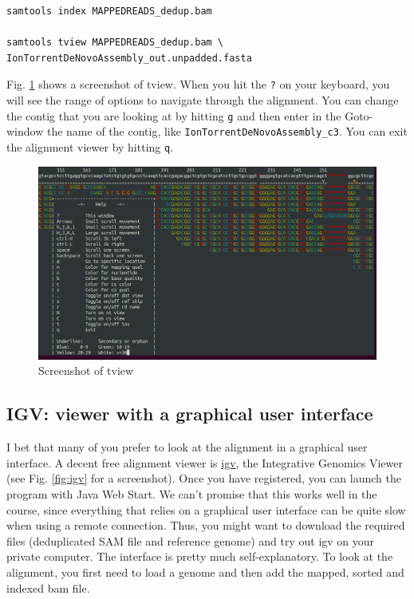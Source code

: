 \documentclass[11pt]{article}
\begin{document}
\begin{verbatim}
samtools index MAPPEDREADS_dedup.bam

samtools tview MAPPEDREADS_dedup.bam \
IonTorrentDeNovoAssembly_out.unpadded.fasta
\end{verbatim}


Fig. \ref{fig:tview} shows a screenshot of tview.  When you hit the \texttt{?} on
your keyboard, you will see the range of options to navigate through
the alignment. You can change the contig that you are looking at by
hitting \texttt{g} and then enter in the Goto-window the name of the contig,
like \texttt{IonTorrentDeNovoAssembly\_c3}.  You can exit the alignment viewer
by hitting \texttt{q}.

\begin{figure}[htb]
\centering
\includegraphics[width=14.5cm]{tview.png}
\caption{\label{fig:tview}Screenshot of tview}
\end{figure}

\clearpage
\subsection{IGV: viewer with a graphical user interface}
\label{sec-3-2}
I bet that many of you prefer to look at the alignment in a graphical
user interface. A decent free alignment viewer is \href{https://www.broadinstitute.org/igv/}{igv}, the Integrative
Genomics Viewer (see Fig. \ref{fig:igv} for a screenshot). Once you have
registered, you can launch the program with Java Web Start. We can't
promise that this works well in the course, since everything that
relies on a graphical user interface can be quite slow when using a
remote connection. Thus, you might want to download the required files
(deduplicated SAM file and reference genome) and try out igv on your
private computer. The interface is pretty much self-explanatory. To
look at the alignment, you first need to load a genome and then add
the mapped, sorted and indexed bam file.
\end{document}
